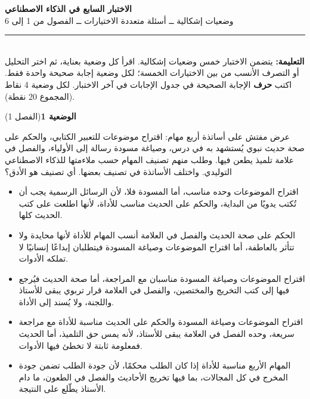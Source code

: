 \documentclass[11pt,a4paper]{article}
\begin{document}
\linespread{1.08}\selectfont
\begin{center}
{\LARGE\khatt\textbf{الاختبار السابع في الذكاء الاصطناعي}}\\[4pt]
{\normalsize وضعيات إشكالية ــ أسئلة متعددة الاختيارات ــ الفصول من 1 إلى 6}
\end{center}
\vspace{-2pt}\rule{\textwidth}{0.6pt}\\[2pt]
\textbf{التعليمة:} يتضمن الاختبار خمس وضعيات إشكالية. اقرأ كل وضعية بعناية، ثم اختر التحليل أو التصرف الأنسب
من بين الاختيارات الخمسة؛ لكل وضعية إجابة صحيحة واحدة فقط.
اكتب \textbf{حرف} الإجابة الصحيحة في جدول الإجابات في آخر الاختبار.
لكل وضعية 4 نقاط (المجموع 20 نقطة).
\vspace{4pt}

\noindent
{\large\khatt\textbf{الوضعية 1}}\hfill{\small(الفصل 1)}\par\nopagebreak\vspace{3pt}
\setlength{\fboxsep}{7pt}\colorbox{gray!10}{\parbox{\dimexpr\linewidth-14pt}{عرض مفتش على أساتذة أربع مهام: اقتراح موضوعات للتعبير الكتابي، والحكم على صحة حديث نبوي يُستشهد به في درس، وصياغة مسودة رسالة إلى الأولياء، والفصل في علامة تلميذ يطعن فيها. وطلب منهم تصنيف المهام حسب ملاءمتها للذكاء الاصطناعي التوليدي. واختلف الأساتذة في تصنيف بعضها. أي تصنيف هو الأدق؟}}\par\nopagebreak
\begin{itemize}[leftmargin=1.0cm, labelsep=6pt, itemsep=3pt, topsep=4pt, parsep=0pt]
  \item[\textbf{أ)}] اقتراح الموضوعات وحده مناسب، أما المسودة فلا، لأن الرسائل الرسمية يجب أن تُكتب يدويًا من البداية، والحكم على الحديث مناسب للأداة، لأنها اطلعت على كتب الحديث كلها.
  \item[\textbf{ب)}] الحكم على صحة الحديث والفصل في العلامة أنسب المهام للأداة لأنها محايدة ولا تتأثر بالعاطفة، أما اقتراح الموضوعات وصياغة المسودة فيتطلبان إبداعًا إنسانيًا لا تملكه الأدوات.
  \item[\textbf{ج)}] اقتراح الموضوعات وصياغة المسودة مناسبان مع المراجعة، أما صحة الحديث فيُرجع فيها إلى كتب التخريج والمختصين، والفصل في العلامة قرار تربوي يبقى للأستاذ واللجنة، ولا يُسند إلى الأداة.
  \item[\textbf{د)}] اقتراح الموضوعات وصياغة المسودة والحكم على الحديث مناسبة للأداة مع مراجعة سريعة، وحده الفصل في العلامة يبقى للأستاذ، لأنه يمس حق التلميذ، أما الحديث فمعلومة ثابتة لا تخطئ فيها الأدوات.
  \item[\textbf{هـ)}] المهام الأربع مناسبة للأداة إذا كان الطلب محكمًا، لأن جودة الطلب تضمن جودة المخرج في كل المجالات، بما فيها تخريج الأحاديث والفصل في الطعون، ما دام الأستاذ يطّلع على النتيجة.
\end{itemize}
\end{document}
